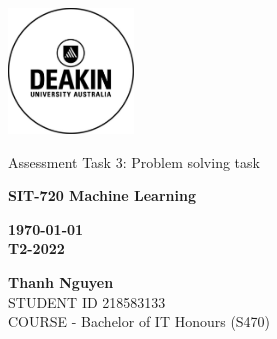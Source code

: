 \thispagestyle{empty}
\begin{titlepage}
    \includegraphics[width=0.25\textwidth]{Appendices/Deakin_Logo.jpeg}
    \begin{center}
        \vspace*{4cm}
        {\LARGE Assessment Task 3: Problem solving task}
        \vspace{3cm}
        \begin{large}


            \bf SIT-720 Machine Learning
            \vspace{1cm}

            \bf \today \\
            T2-2022

            \vspace{3cm}
            \textbf{Thanh Nguyen}\\
            STUDENT ID 218583133 \\
            COURSE - Bachelor of IT Honours (S470)
            \vfill

        \end{large}
    \end{center}
\end{titlepage}

